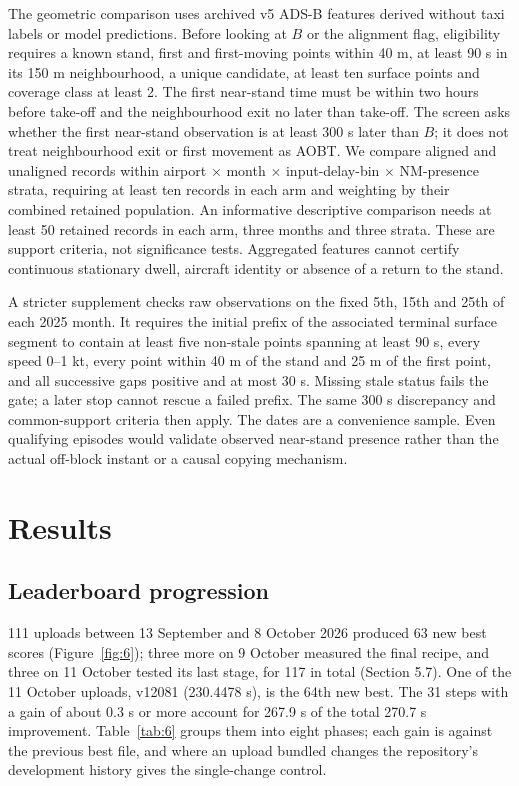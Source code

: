 \documentclass[
  manuscript=article,  %
  layout=preprint,     %
  year=2026,
  volume=4,
]{extra/joas}
\begin{document}
The geometric comparison uses archived v5 ADS-B features derived without taxi labels or model predictions. Before looking at \(B\) or the alignment flag, eligibility requires a known stand, first and first-moving points within 40 m, at least 90 s in its 150 m neighbourhood, a unique candidate, at least ten surface points and coverage class at least 2. The first near-stand time must be within two hours before take-off and the neighbourhood exit no later than take-off. The screen asks whether the first near-stand observation is at least 300 s later than \(B\); it does not treat neighbourhood exit or first movement as AOBT. We compare aligned and unaligned records within airport $\times$ month $\times$ input-delay-bin $\times$ NM-presence strata, requiring at least ten records in each arm and weighting by their combined retained population. An informative descriptive comparison needs at least 50 retained records in each arm, three months and three strata. These are support criteria, not significance tests. Aggregated features cannot certify continuous stationary dwell, aircraft identity or absence of a return to the stand.

A stricter supplement checks raw observations on the fixed 5th, 15th and 25th of each 2025 month. It requires the initial prefix of the associated terminal surface segment to contain at least five non-stale points spanning at least 90 s, every speed 0--1 kt, every point within 40 m of the stand and 25 m of the first point, and all successive gaps positive and at most 30 s. Missing stale status fails the gate; a later stop cannot rescue a failed prefix. The same 300 s discrepancy and common-support criteria then apply. The dates are a convenience sample. Even qualifying episodes would validate observed near-stand presence rather than the actual off-block instant or a causal copying mechanism.

\section{Results}\label{results}

\subsection{Leaderboard progression}\label{leaderboard-progression}

111 uploads between 13 September and 8 October 2026 produced 63 new best scores (Figure~\ref{fig:6}); three more on 9 October measured the final recipe, and three on 11 October tested its last stage, for 117 in total (Section 5.7). One of the 11 October uploads, v12081 (230.4478 s), is the 64th new best. The 31 steps with a gain of about 0.3 s or more account for 267.9 s of the total 270.7 s improvement. Table~\ref{tab:6} groups them into eight phases; each gain is against the previous best file, and where an upload bundled changes the repository's development history gives the single-change control.
\end{document}
